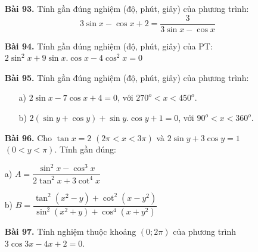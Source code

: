 \documentclass[12pt,a4paper]{article}
\begin{document}
\begin{enumerate}
\item[\textbf{Bài 93.}] Tính gần đúng nghiệm (độ, phút, giây) của phương trình:
$$3\sin x - \cos x + 2 = \dfrac{3}{3\sin x - \cos x}$$
\item[\textbf{Bài 94.}] Tính gần đúng nghiệm (độ, phút, giây) của PT: $2\sin^2 x + 9\sin x.\cos x - 4\cos^2 x= 0$
\item[\textbf{Bài 95.}] Tính gần đúng nghiệm (độ, phút, giây) của phương trình:
\begin{enumerate}
\item[a)] $2\sin x - 7\cos x + 4 = 0$, với $270^o < x < 450^o$.
\item[b)] $2(\sin y + \cos y) + \sin y.\cos y + 1 = 0$, với $90^o < x < 360^o$.
\end{enumerate}
\item[\textbf{Bài 96.}] Cho $\tan x = 2$ $(2\pi < x <3\pi)$ và $2\sin y + 3\cos y = 1$ $(0 < y < \pi)$. Tính gần đúng: 
\item[a)] $A = \dfrac{\sin^2 x - \cos^3 x}{2\tan^2 x + 3\cot^4 x}$
\item[b)] $B = \dfrac{\tan^2(x^2 - y) + \cot^2(x-y^2)}{\sin^2(x^2 + y) + \cos^4(x+y^2)}$
\item[\textbf{Bài 97.}] Tính nghiệm thuộc khoảng $(0;2\pi)$ của phương trình $3\cos3x - 4x + 2 = 0$.
\end{enumerate}
\newpage
\end{document}
